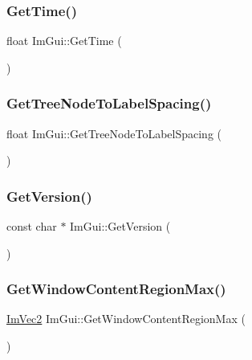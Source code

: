 \subsubsection{\texorpdfstring{Get\+Time()}{GetTime()}}
{\footnotesize\ttfamily float Im\+Gui\+::\+Get\+Time (\begin{DoxyParamCaption}{ }\end{DoxyParamCaption})}

\mbox{\label{namespace_im_gui_a5c89cb6b42296d0f7db75027efc0fb7a}} 
\subsubsection{\texorpdfstring{Get\+Tree\+Node\+To\+Label\+Spacing()}{GetTreeNodeToLabelSpacing()}}
{\footnotesize\ttfamily float Im\+Gui\+::\+Get\+Tree\+Node\+To\+Label\+Spacing (\begin{DoxyParamCaption}{ }\end{DoxyParamCaption})}

\mbox{\label{namespace_im_gui_a6488c3cfa6331c8a1e93769e580ce020}} 
\subsubsection{\texorpdfstring{Get\+Version()}{GetVersion()}}
{\footnotesize\ttfamily const char $\ast$ Im\+Gui\+::\+Get\+Version (\begin{DoxyParamCaption}{ }\end{DoxyParamCaption})}

\mbox{\label{namespace_im_gui_a96ce6060592d3ef975594357e650adc6}} 
\subsubsection{\texorpdfstring{Get\+Window\+Content\+Region\+Max()}{GetWindowContentRegionMax()}}
{\footnotesize\ttfamily \mbox{\hyperlink{struct_im_vec2}{Im\+Vec2}} Im\+Gui\+::\+Get\+Window\+Content\+Region\+Max (\begin{DoxyParamCaption}{ }\end{DoxyParamCaption})}

